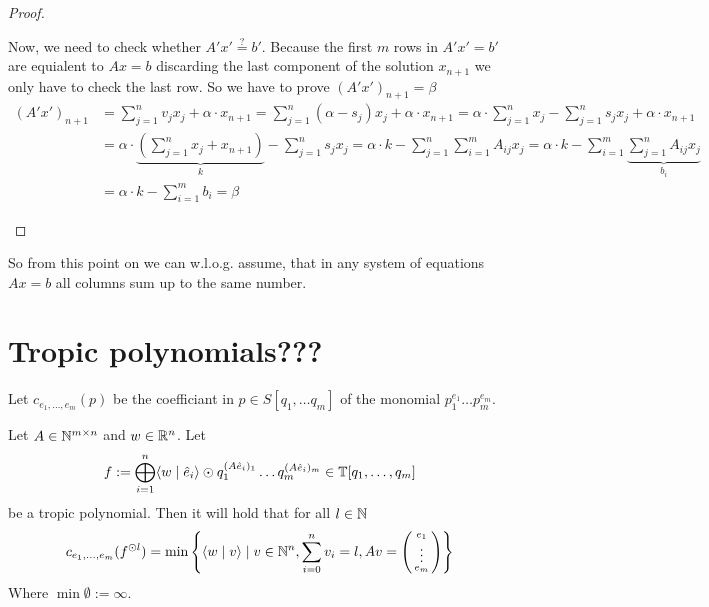 \begin{proof}
\begin{itemize}
        Now, we need to check whether $A'x'\stackrel{?}{=}b'$. Because the first $m$ rows in $A'x'=b'$ are equialent to $Ax=b$ discarding the last component of the solution $x_{n+1}$ we only have to check the last row. So we have to prove $(A'x')_{n+1} = \beta$
        \begin{align*}
            (A'x')_{n+1} &= \sum_{j=1}^{n}v_jx_j + \alpha \cdot x_{n+1} = \sum_{j=1}^{n}(\alpha - s_j)x_j + \alpha \cdot x_{n+1} = \alpha \cdot \sum_{j=1}^{n}x_j - \sum_{j=1}^{n}s_jx_j + \alpha \cdot x_{n+1}\\
            &= \alpha \cdot \underbrace{\left(\sum_{j=1}^{n}x_j + x_{n+1}\right)}_k - \sum_{j=1}^{n}s_jx_j = \alpha \cdot k - \sum_{j=1}^{n}\sum_{i=1}^{m}A_{ij}x_j = \alpha\cdot k - \sum_{i=1}^{m}\underbrace{\sum_{j=1}^{n}A_{ij}x_j}_{b_i}\\
            &= \alpha\cdot k - \sum_{i=1}^{m}b_i = \beta
        \end{align*}
    \end{itemize}
\end{proof}
So from this point on we can w.l.o.g. assume, that in any system of equations $Ax=b$ all columns sum up to the same number.

\section{Tropic polynomials???}
Let $c_{e_1, \dots, e_m}(p)$ be the coefficiant in $p \in S[q_1, \dots q_m]$ of the monomial $p_1^{e_1}\dots p_m^{e_m}$. 

\begin{lemma}
    \label{lemma:prem_trop_poly}
    Let $A \in \mathbb{N}^{m \times n}$ and $w \in \mathbb{R}^n$. Let
    $$f := \bigoplus_{i=1}^{n} \langle w \mid \hat e_i \rangle\odot  q_1^{(A\hat e_i)_1}\dots q_m^{(A\hat e_i)_m} \in \mathbb{T}[q_1, \dots, q_m]$$
    be a tropic polynomial. Then it will hold that for all $l \in \mathbb{N}$
    $$c_{e_1, \dots, e_m}(f^{\odot l}) = \min\left\{\langle w \mid v \rangle \mid v \in \mathbb{N}^n, \sum_{i=0}^{n}v_i = l, Av=\left(\begin{smallmatrix}e_1\\\vdots\\e_m\end{smallmatrix}\right)\right\}$$
    Where $\min\emptyset:=\infty$.
\end{lemma}

